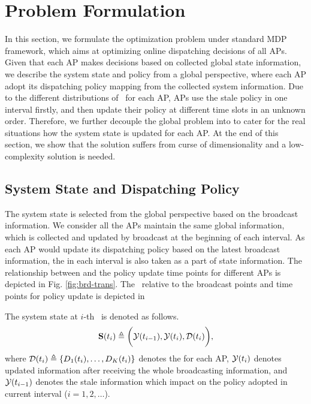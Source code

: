 \section{Problem Formulation}
In this section, we formulate the optimization problem under standard MDP framework, which aims at optimizing online dispatching decisions of all APs.
Given that each AP makes decisions based on collected global state information, we describe the system state and policy from a global perspective, where each AP adopt its dispatching policy mapping from the collected system information.
Due to the different distributions of \brdelay~for each AP, APs use the stale policy in one interval firstly, and then update their policy at different time slots in an unknown order.
Therefore, we further decouple the global problem into  to cater for the real situations how the system state is updated for each AP.
At the end of this section, we show that the solution suffers from curse of dimensionality and a low-complexity solution is needed.

\subsection{System State and Dispatching Policy}
The system state is selected from the global perspective based on the broadcast information.
We consider all the APs maintain the same global information, which is collected and updated by broadcast at the beginning of each interval.
As each AP would update its dispatching policy based on the latest broadcast information, the  in each interval is also taken as a part of state information.
The relationship between \brdelay and the policy update time points for different APs is depicted in Fig. \ref{fig:brd-trans}.
The \brdelay~relative to the broadcast points and time points for policy update is depicted in 
\begin{definition}
    The system state at $i$-th \brpoint~is denoted as follows.
    \begin{align}
        \mathbf{S}(t_i) \triangleq \bigg(
            \mathcal{Y}(t_{i-1}), \mathcal{Y}({t_{i}}), \mathcal{D}(t_{i})
        \bigg),
    \end{align}
    where $\mathcal{D}(t_{i}) \triangleq \{D_{1}(t_{i}), \dots, D_{K}(t_{i})\}$ denotes the \brdelay for each AP, $\mathcal{Y}(t_{i})$ denotes updated information after receiving the whole broadcasting information, and $\mathcal{Y}(t_{i-1})$ denotes the stale information which impact on the policy adopted in current interval ($i=1,2,\dots$).
\end{definition}

